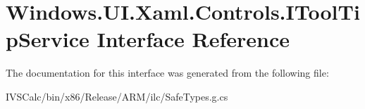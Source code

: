 \hypertarget{interface_windows_1_1_u_i_1_1_xaml_1_1_controls_1_1_i_tool_tip_service}{}\section{Windows.\+U\+I.\+Xaml.\+Controls.\+I\+Tool\+Tip\+Service Interface Reference}
\label{interface_windows_1_1_u_i_1_1_xaml_1_1_controls_1_1_i_tool_tip_service}


The documentation for this interface was generated from the following file\+:\begin{DoxyCompactItemize}
\item 
I\+V\+S\+Calc/bin/x86/\+Release/\+A\+R\+M/ilc/Safe\+Types.\+g.\+cs\end{DoxyCompactItemize}
